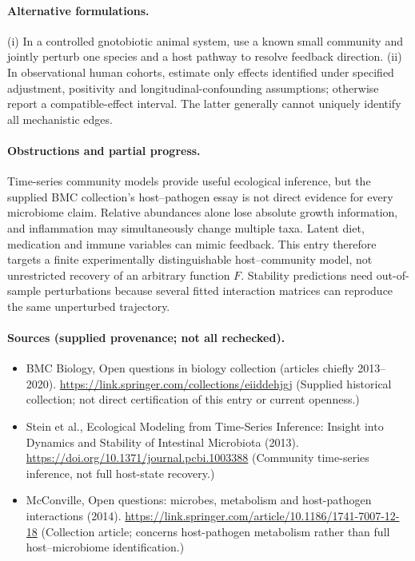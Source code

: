 \documentclass[11pt]{article}
\begin{document}
\paragraph{Alternative formulations.} (i) In a controlled gnotobiotic animal system, use a known small community and jointly perturb one species and a host pathway to resolve feedback direction. (ii) In observational human cohorts, estimate only effects identified under specified adjustment, positivity and longitudinal-confounding assumptions; otherwise report a compatible-effect interval. The latter generally cannot uniquely identify all mechanistic edges.
\paragraph{Obstructions and partial progress.} Time-series community models provide useful ecological inference, but the supplied BMC collection's host--pathogen essay is not direct evidence for every microbiome claim. Relative abundances alone lose absolute growth information, and inflammation may simultaneously change multiple taxa. Latent diet, medication and immune variables can mimic feedback. This entry therefore targets a finite experimentally distinguishable host--community model, not unrestricted recovery of an arbitrary function $F$. Stability predictions need out-of-sample perturbations because several fitted interaction matrices can reproduce the same unperturbed trajectory.
\paragraph{Sources (supplied provenance; not all rechecked).}
\begin{itemize}
\item BMC Biology, Open questions in biology collection (articles chiefly 2013--2020). \url{https://link.springer.com/collections/eiiddehjgj} (Supplied historical collection; not direct certification of this entry or current openness.)
\item Stein et al., Ecological Modeling from Time-Series Inference: Insight into Dynamics and Stability of Intestinal Microbiota (2013). \url{https://doi.org/10.1371/journal.pcbi.1003388} (Community time-series inference, not full host-state recovery.)
\item McConville, Open questions: microbes, metabolism and host-pathogen interactions (2014). \url{https://link.springer.com/article/10.1186/1741-7007-12-18} (Collection article; concerns host-pathogen metabolism rather than full host--microbiome identification.)
\end{itemize}
\end{document}
